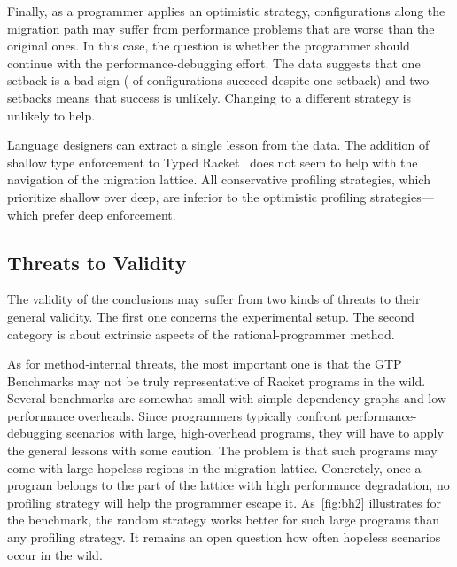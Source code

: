 Finally, as a programmer applies an optimistic strategy, configurations along
the migration path may suffer from performance problems that are worse than the original
ones. In this case, the question is whether the programmer should continue with
the performance-debugging effort. The data suggests that one setback is
a bad sign ( of configurations succeed despite one setback) and two
setbacks means that success is unlikely.
Changing to a different strategy is unlikely to help.


Language designers can extract a single lesson from the data.
The addition of shallow type enforcement to
Typed Racket~\cite{g-deep-shallow} does not seem to help with the navigation of the migration
lattice. All conservative profiling strategies, which prioritize shallow over
deep, are inferior to the optimistic profiling strategies---which prefer deep
enforcement. 

\subsection{Threats to Validity} \label{subsec:threats}

The validity of the conclusions may suffer from two kinds of threats to their
general validity.  The first one concerns the experimental setup. The second
category is about extrinsic aspects of the rational-programmer method.

As for method-internal threats, the most important one is that the GTP Benchmarks
may not be truly representative of Racket programs in the wild. Several benchmarks
are somewhat small with simple dependency graphs and low performance overheads.
Since programmers typically confront performance-debugging scenarios with large,
high-overhead programs, they will have to apply the general lessons with some
caution. The problem is that such programs may come with large hopeless regions in
the migration lattice. Concretely, once a program belongs to the part of the
lattice with high performance degradation, no profiling strategy will help the
programmer escape it.
As~\cref{fig:bh2} illustrates for the  benchmark, the random
strategy works better for such large programs than any profiling strategy.  It
remains an open question how often hopeless scenarios occur in the wild.

